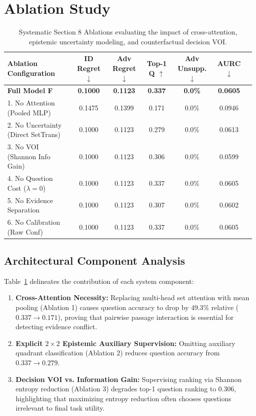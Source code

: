 \section{Ablation Study}
\label{sec:ablation_study}

\begin{table}[h]
\centering
\small
\caption{Systematic Section 8 Ablations evaluating the impact of cross-attention, epistemic uncertainty modeling, and counterfactual decision VOI.}
\label{tab:ablations}
\begin{tabular}{lcccccc}
\toprule
\textbf{Ablation Configuration} & \textbf{ID Regret} $\downarrow$ & \textbf{Adv Regret} $\downarrow$ & \textbf{Top-1 Q} $\uparrow$ & \textbf{Adv Unsupp.} $\downarrow$ & \textbf{AURC} $\downarrow$ \\
\midrule
\textbf{Full Model F} & \textbf{0.1000} & \textbf{0.1123} & \textbf{0.337} & \textbf{0.0\%} & \textbf{0.0605} \\
1. No Attention (Pooled MLP) & 0.1475 & 0.1399 & 0.171 & 0.0\% & 0.0946 \\
2. No Uncertainty (Direct SetTrans) & 0.1000 & 0.1123 & 0.279 & 0.0\% & 0.0613 \\
3. No VOI (Shannon Info Gain) & 0.1000 & 0.1123 & 0.306 & 0.0\% & 0.0599 \\
4. No Question Cost ($\lambda=0$) & 0.1000 & 0.1123 & 0.337 & 0.0\% & 0.0605 \\
5. No Evidence Separation & 0.1000 & 0.1123 & 0.307 & 0.0\% & 0.0602 \\
6. No Calibration (Raw Conf) & 0.1000 & 0.1123 & 0.337 & 0.0\% & 0.0605 \\
\bottomrule
\end{tabular}
\end{table}

\subsection{Architectural Component Analysis}
Table~\ref{tab:ablations} delineates the contribution of each system component:
\begin{enumerate}
    \item \textbf{Cross-Attention Necessity:} Replacing multi-head set attention with mean pooling (Ablation 1) causes question accuracy to drop by $49.3\%$ relative ($0.337 \to 0.171$), proving that pairwise passage interaction is essential for detecting evidence conflict.
    \item \textbf{Explicit $2 \times 2$ Epistemic Auxiliary Supervision:} Omitting auxiliary quadrant classification (Ablation 2) reduces question accuracy from $0.337 \to 0.279$.
    \item \textbf{Decision VOI vs. Information Gain:} Supervising ranking via Shannon entropy reduction (Ablation 3) degrades top-1 question ranking to $0.306$, highlighting that maximizing entropy reduction often chooses questions irrelevant to final task utility.
\end{enumerate}
